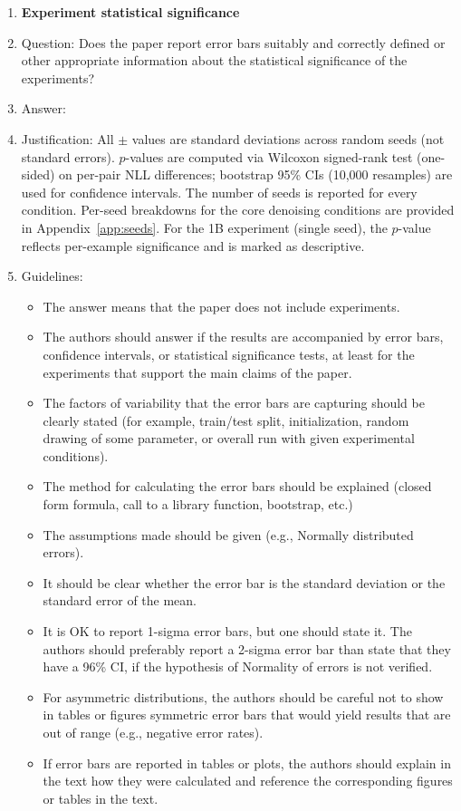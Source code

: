 \documentclass{article}
\begin{document}
\begin{enumerate}
\item {\bf Experiment statistical significance}
    \item[] Question: Does the paper report error bars suitably and correctly defined or other appropriate information about the statistical significance of the experiments?
    \item[] Answer: \answerYes{}
    \item[] Justification: All $\pm$ values are standard deviations across random seeds (not standard errors). $p$-values are computed via Wilcoxon signed-rank test (one-sided) on per-pair NLL differences; bootstrap 95\% CIs (10{,}000 resamples) are used for confidence intervals. The number of seeds is reported for every condition. Per-seed breakdowns for the core denoising conditions are provided in Appendix~\ref{app:seeds}. For the 1B experiment (single seed), the $p$-value reflects per-example significance and is marked as descriptive.
    \item[] Guidelines:
    \begin{itemize}
        \item The answer \answerNA{} means that the paper does not include experiments.
        \item The authors should answer \answerYes{} if the results are accompanied by error bars, confidence intervals, or statistical significance tests, at least for the experiments that support the main claims of the paper.
        \item The factors of variability that the error bars are capturing should be clearly stated (for example, train/test split, initialization, random drawing of some parameter, or overall run with given experimental conditions).
        \item The method for calculating the error bars should be explained (closed form formula, call to a library function, bootstrap, etc.)
        \item The assumptions made should be given (e.g., Normally distributed errors).
        \item It should be clear whether the error bar is the standard deviation or the standard error of the mean.
        \item It is OK to report 1-sigma error bars, but one should state it. The authors should preferably report a 2-sigma error bar than state that they have a 96\% CI, if the hypothesis of Normality of errors is not verified.
        \item For asymmetric distributions, the authors should be careful not to show in tables or figures symmetric error bars that would yield results that are out of range (e.g., negative error rates).
        \item If error bars are reported in tables or plots, the authors should explain in the text how they were calculated and reference the corresponding figures or tables in the text.
    \end{itemize}


\end{enumerate}
\end{document}
